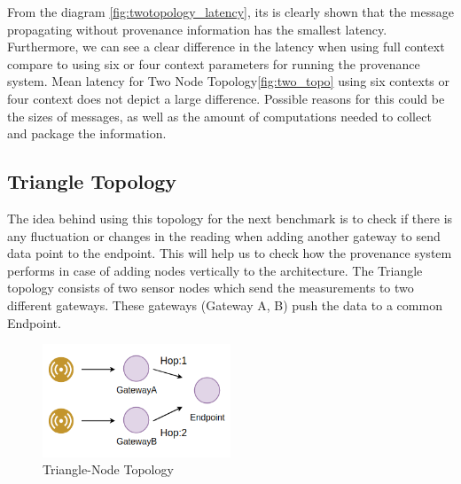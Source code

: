 From the diagram \ref{fig:twotopology_latency}, its is clearly shown that the message propagating without provenance information has the smallest latency. Furthermore, we can see a clear difference in the latency when using full context compare to using six or four context parameters for running the provenance system. Mean latency for Two Node Topology\ref{fig:two_topo} using six contexts or four context does not depict a large difference. Possible reasons for this could be the sizes of messages, as well as the amount of computations needed to collect and package the information.


\subsection*{Triangle Topology}The idea behind using this topology for the next benchmark is to check if there is any fluctuation or changes in the reading when adding another gateway to send data point to the endpoint. This will help us to check how the provenance system performs in case of adding nodes vertically to the architecture. The Triangle topology consists of two sensor nodes which send the measurements to two different gateways. These gateways (Gateway A, B) push the data to a common Endpoint.

\begin{figure}[H]
	\center
	\includegraphics[width=0.5\textwidth]{figures/latencytopo_triangle.png}
	\caption{Triangle-Node Topology}
	\label{fig:triangle_topo}
\end{figure}


